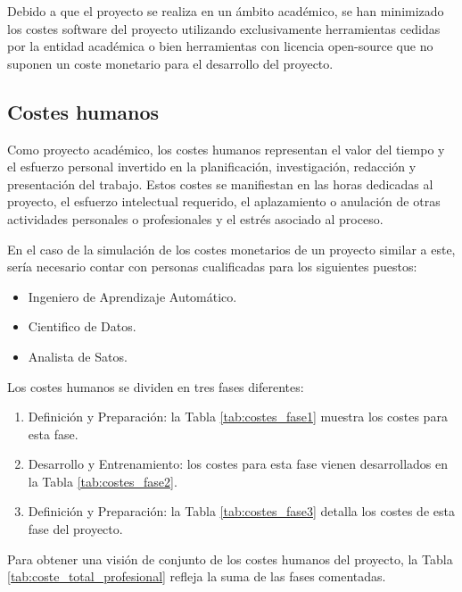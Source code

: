 Debido a que el proyecto se realiza en un ámbito académico, se han minimizado los costes software del proyecto utilizando exclusivamente herramientas cedidas por la entidad académica o bien herramientas con licencia open-source que no suponen un coste monetario para el desarrollo del proyecto. 


\subsection{Costes humanos} \label{subsec.costeshumanos}
Como proyecto académico, los costes humanos representan el valor del tiempo y el esfuerzo personal invertido en la planificación, investigación, redacción y presentación del trabajo. Estos costes se manifiestan en las horas dedicadas al proyecto, el esfuerzo intelectual requerido, el aplazamiento o anulación de otras actividades personales o profesionales y el estrés asociado al proceso.

En el caso de la simulación de los costes monetarios de un proyecto similar a este, sería necesario contar con personas cualificadas para los siguientes puestos:
\begin{itemize}
\item Ingeniero de Aprendizaje Automático.
\item Cientifico de Datos.
\item Analista de Satos.
\end{itemize}

Los costes humanos se dividen en tres fases diferentes:
\begin{enumerate}
	\item Definición y Preparación: la Tabla \ref{tab:costes_fase1} muestra los costes para esta fase.
	\item Desarrollo y Entrenamiento: los costes para esta fase vienen desarrollados en la Tabla \ref{tab:costes_fase2}.
	\item Definición y Preparación: la Tabla \ref{tab:costes_fase3} detalla los costes de esta fase del proyecto.
\end{enumerate}

Para obtener una visión de conjunto de los costes humanos del proyecto, la Tabla \ref{tab:coste_total_profesional} refleja la suma de las fases comentadas.


